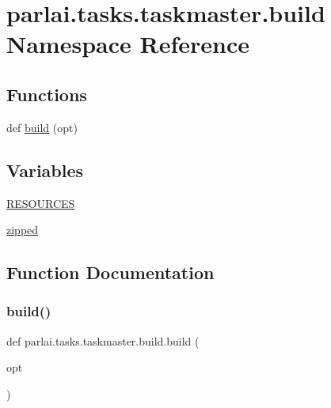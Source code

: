 \hypertarget{namespaceparlai_1_1tasks_1_1taskmaster_1_1build}{}\section{parlai.\+tasks.\+taskmaster.\+build Namespace Reference}
\label{namespaceparlai_1_1tasks_1_1taskmaster_1_1build}
\subsection*{Functions}
\begin{DoxyCompactItemize}
\item 
def \hyperlink{namespaceparlai_1_1tasks_1_1taskmaster_1_1build_a9a432c354754067775ff8c419e2e4ffe}{build} (opt)
\end{DoxyCompactItemize}
\subsection*{Variables}
\begin{DoxyCompactItemize}
\item 
\hyperlink{namespaceparlai_1_1tasks_1_1taskmaster_1_1build_ab4e1e1aa4bfa24c0ffbafacab10c4da3}{R\+E\+S\+O\+U\+R\+C\+ES}
\item 
\hyperlink{namespaceparlai_1_1tasks_1_1taskmaster_1_1build_a9608ac3d1abab305d0ea767c0c3db0d0}{zipped}
\end{DoxyCompactItemize}


\subsection{Function Documentation}
\mbox{\label{namespaceparlai_1_1tasks_1_1taskmaster_1_1build_a9a432c354754067775ff8c419e2e4ffe}} 
\subsubsection{\texorpdfstring{build()}{build()}}
{\footnotesize\ttfamily def parlai.\+tasks.\+taskmaster.\+build.\+build (\begin{DoxyParamCaption}\item[{}]{opt }\end{DoxyParamCaption})}



